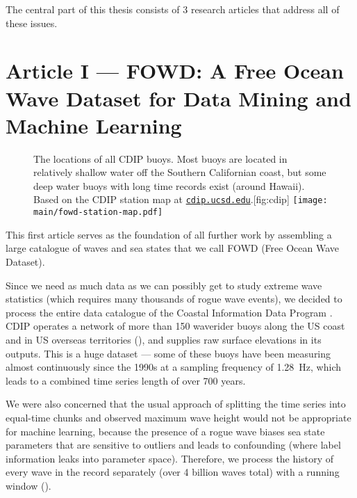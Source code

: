 The central part of this thesis consists of 3 research articles that address all of these issues.

\cleardoublepage
\section{Article I --- FOWD: A Free Ocean Wave Dataset for Data Mining and Machine Learning}

\begin{figure}
    \strictpagechecktrue
    \begin{sidecaption}{The locations of all CDIP buoys. Most buoys are located in relatively shallow water off the Southern Californian coast, but some deep water buoys with long time records exist (\eg around Hawaii). Based on the CDIP station map at \href{https://cdip.ucsd.edu}{\texttt{cdip.ucsd.edu}}.}[fig:cdip]
    \texttt{[image: main/fowd-station-map.pdf]}
    \end{sidecaption}
\end{figure}

%
This first article \citep{hafner_fowd_2021} serves as the foundation of all further work by assembling a large catalogue of waves and sea states that we call FOWD (Free Ocean Wave Dataset).

Since we need as much data as we can possibly get to study extreme wave statistics (which requires many thousands of rogue wave events), we decided to process the entire data catalogue of the Coastal Information Data Program \citep[CDIP,][]{behrens_cdip_2019}.
CDIP operates a network of more than 150 waverider buoys along the US coast and in US overseas territories (), and supplies raw surface elevations in its outputs. This is a huge dataset --- some of these buoys have been measuring almost continuously since the 1990s at a sampling frequency of \SI{1.28}{\hertz}, which leads to a combined time series length of over 700 years.

We were also concerned that the usual approach of splitting the time series into equal-time chunks and observed maximum wave height \citep[as \eg in][]{casasprat_short-term_2010,christou_field_2014} would not be appropriate for machine learning, because the presence of a rogue wave biases sea state parameters that are sensitive to outliers and leads to confounding (where label information leaks into parameter space). Therefore, we process the history of every wave in the record separately (over 4 billion waves total) with a running window ().

